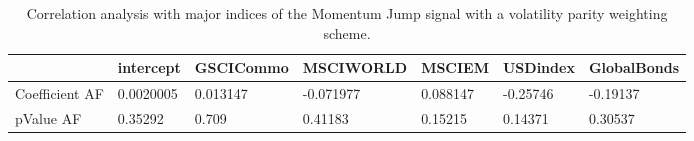 \begin{table}[H]
\centering
\begin{tabular}{lllllll}
\hline& intercept & GSCICommo & MSCIWORLD & MSCIEM & USDindex & GlobalBonds \\ 
\hline 
Coefficient AF & 0.0020005 & 0.013147 & -0.071977 & 0.088147 & -0.25746 & -0.19137 \\ 
pValue AF & 0.35292 & 0.709 & 0.41183 & 0.15215 & 0.14371 & 0.30537 \\ 
\hline
\end{tabular}
\caption{Correlation analysis with major indices of the Momentum Jump signal with a volatility parity weighting scheme.}
\label{MOMJUMPVP_AFACTOR}
\end{table}